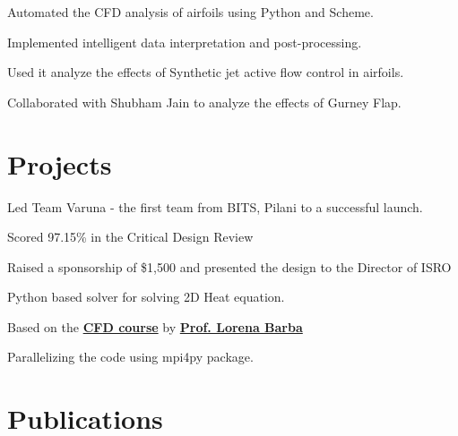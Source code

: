 \documentclass[]{resume}
\begin{document}
\begin{minipage}[t]{0.66\textwidth}
\begin{tightemize}
\item Automated the CFD analysis of airfoils using Python and Scheme.
\item Implemented intelligent data interpretation and post-processing.
\item Used it analyze the effects of Synthetic jet active flow control in airfoils.
\item Collaborated with Shubham Jain to analyze the effects of Gurney Flap.
\end{tightemize}
\sectionsep


\section{Projects}
\begin{tightemize}
\item Led Team Varuna - the first team from BITS, Pilani to a successful launch.
\item Scored 97.15\% in the Critical Design Review
\item Raised a sponsorship of \$1,500 and presented the design to the Director of ISRO
\end{tightemize}
\sectionsep

\begin{tightemize}
\item Python based solver for solving 2D Heat equation.
\item Based on the \textbf{\href{https://itunes.apple.com/us/itunes-u/computational-fluid-dynamics/id452560554?mt=10}
		{CFD course}} by \textbf{\href{http://lorenabarba.com}{Prof. Lorena Barba}}
\item Parallelizing the code using mpi4py package.
\end{tightemize}
\sectionsep


\section{Publications}
\renewcommand\refname{\vskip -1.5cm} %


\nocite{*}

\end{minipage}
\end{document}
